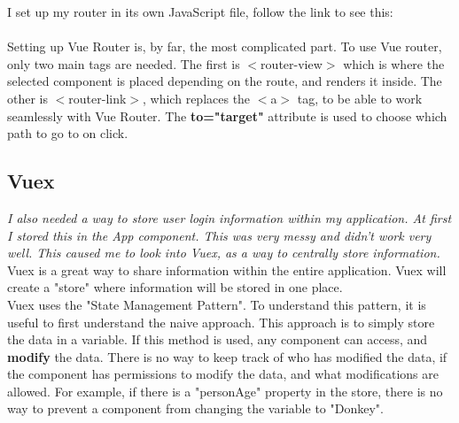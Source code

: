 \documentclass[portfolio.tex]{subfiles}
\begin{document}
		I set up my router in its own JavaScript file, follow the link to see this: \\
		\\

		Setting up Vue Router is, by far, the most complicated part. To use Vue router, only two main tags are needed. The first is $<$router-view$>$ which is where the selected component is placed depending on the route, and renders it inside. The other is $<$router-link$>$, which replaces the $<$a$>$ tag, to be able to work seamlessly with Vue Router. The \textbf{to="target"} attribute is used to choose which path to go to on click. \\

		\subsection{Vuex}
			\label{vuex}

			\textit{I also needed a way to store user login information within my application. At first I stored this in the App component. This was very messy and didn't work very well. This caused me to look into Vuex, as a way to centrally store information. }\\

			Vuex is a great way to share information within the entire application. Vuex will create a "store" where information will be stored in one place.\\

			Vuex uses the "State Management Pattern". To understand this pattern, it is useful to first understand the naive approach. This approach is to simply store the data in a variable. If this method is used, any component can access, and \textbf{modify} the data. There is no way to keep track of who has modified the data, if the component has permissions to modify the data, and what modifications are allowed. For example, if there is a "personAge" property in the store, there is no way to prevent a component from changing the variable to "Donkey". \\

			\hspace{-1.4cm}
			\vspace{0.2cm}
\end{document}
